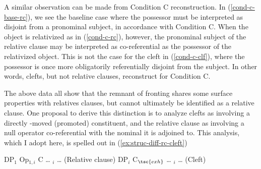 \documentclass[12pt]{article}
\begin{document}
A similar observation can be made from Condition C reconstruction. In (\ref{cond-c-base-rc}), we see the baseline case where the possessor  must be interpreted as disjoint from a pronominal subject, in accordance with Condition C. When the object is relativized as in (\ref{cond-c-rc}), however, the pronominal subject of the relative clause may be interpreted as co-referential as the possessor of the relativized object. This is not the case for the cleft in (\ref{cond-c-clf}), where the possessor is once more obligatorily referentially disjoint from the subject. In other words, clefts, but not relative clauses, reconstruct for Condition C.

\bex
{} \label{cond-c-base-rc}
\ex {}
\bxl
{} \label{cond-c-rc}
 \label{cond-c-clf}
\fxl
\fex

The above data all show that the remnant of fronting shares some surface properties with relatives clauses, but cannot ultimately be identified as a relative clause. One proposal to derive this distinction is to analyze clefts as involving a directly \abar{}-moved (promoted) constituent, and the relative clause as involving a null operator co-referential with the nominal it is adjoined to. This analysis, which I adopt here, is spelled out in (\ref{ex:struc-diff-rc-cleft})

\bex
\ex {} \label{ex:struc-diff-rc-cleft} \bxl
\ex {} DP$_1$  Op$_{1,i}$ C  \ldots{} $_i$ \ldots{} \rb{}\rb{}\rb{} \hfill (Relative clause) \label{ex:struc-rc}
\ex {} DP$_i$ C$_{\tsc{exh}}$  \ldots{} $_i$ \ldots{} \rb{}\rb{} \hfill (Cleft) \label{ex:struc-cleft}
\fxl
\fex
\end{document}
